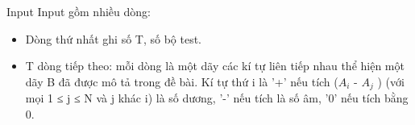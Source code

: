 Input  
Input gồm nhiều dòng:  
\begin{itemize}
	\item     Dòng thứ nhất ghi số T, số bộ test.   
	\item     T dòng tiếp theo: mỗi dòng là một dãy các kí tự liên tiếp nhau thể hiện một dãy B đã được mô tả trong đề bài. Kí tự thứ i là '+' nếu tích ($A_{i}$    - $A_{j}$    ) (với mọi 1 ≤ j ≤ N và j khác i) là số dương, '-' nếu tích là số âm, '0' nếu tích bằng 0.   
\end{itemize}